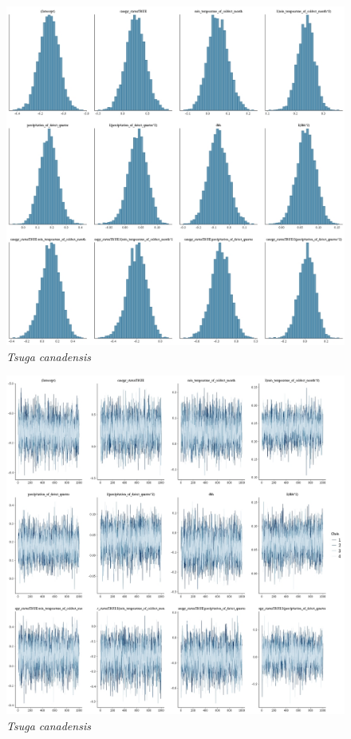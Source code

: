 \documentclass[letterpaper, 12pt]{article}
\begin{document}
\begin{figure}
	\centering
	\includegraphics[scale=0.4]{./183397-TSU-CAN_hist}
	\caption{\textit{Tsuga canadensis}}
\end{figure}

\begin{figure}
	\centering
	\includegraphics[scale=0.4]{./183397-TSU-CAN_traces}
	\caption{\textit{Tsuga canadensis}}
\end{figure}
\end{document}
